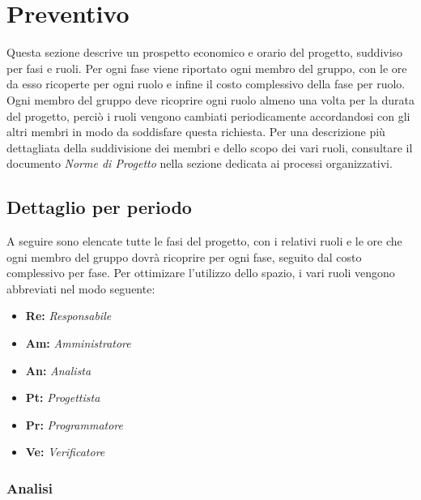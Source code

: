 \newpage

\section{Preventivo}\label{sec:preventivo}

Questa sezione descrive un prospetto economico e orario del progetto, suddiviso per fasi e ruoli. Per ogni fase viene riportato ogni membro del gruppo, con le ore da esso ricoperte per ogni ruolo e infine il costo complessivo della fase per ruolo.
Ogni membro del gruppo deve ricoprire ogni ruolo almeno una volta per la durata del progetto, perciò i ruoli vengono cambiati periodicamente accordandosi con gli altri membri in modo da soddisfare questa richiesta.
Per una descrizione più dettagliata della suddivisione dei membri e dello scopo dei vari ruoli, consultare il documento \textit{Norme di Progetto} nella sezione dedicata ai processi organizzativi.\\

\subsection{Dettaglio per periodo}\label{sec:preventivo:periodi}
A seguire sono elencate tutte le fasi del progetto, con i relativi ruoli e le ore che ogni membro del gruppo dovrà ricoprire per ogni fase, seguito dal costo complessivo per fase. Per ottimizare l'utilizzo dello spazio, i vari ruoli vengono abbreviati nel modo seguente:\\
\begin{itemize}
    \item \textbf{Re:} \textit{Responsabile}
    \item \textbf{Am:} \textit{Amministratore}
    \item \textbf{An:} \textit{Analista}
    \item \textbf{Pt:} \textit{Progettista}
    \item \textbf{Pr:} \textit{Programmatore}
    \item \textbf{Ve:} \textit{Verificatore}
\end{itemize}


\subsubsection{Analisi}\label{sec:preventivo:periodi:analisi}

